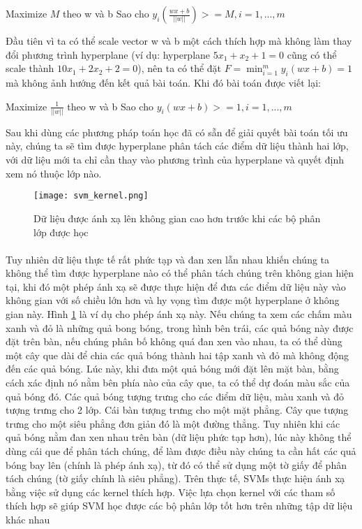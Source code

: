 \begin{center}
Maximize $M$ theo w và b
\linebreak
Sao cho $y_i(\frac{wx + b}{||w||}) >= M, i = 1, ..., m$
\end{center}

Đầu tiên vì ta có thể scale vector w và b một cách thích hợp mà không làm thay đổi phương trình hyperplane (ví dụ: hyperplane $5x_1 + x_2 + 1 = 0$ cũng có thể scale thành $10x_1 + 2x_2 + 2 = 0$), nên ta có thể đặt $F = \min_{i=1}^m {y_i(wx + b)} = 1 $ mà không ảnh hướng đến kết quả bài toán. Khi đó bài toán được viết lại:

\begin{center}
Maximize $\frac{1}{||w||}$ theo w và b
\linebreak
Sao cho $y_i({wx + b}) >= 1, i = 1, ..., m$
\end{center}

Sau khi dùng các phương pháp toán học đã có sẵn để giải quyết bài toán tối ưu này, chúng ta sẽ tìm được hyperplane phân tách các điểm dữ liệu thành hai lớp, với dữ liệu mới ta chỉ cần thay vào phương trình của hyperplane và quyết định xem nó thuộc lớp nào.

\begin{figure}[h!]
	\centering
	\captionsetup{width=0.8\textwidth}
	\texttt{[image: svm\_kernel.png]}
	\caption{Dữ liệu được ánh xạ lên không gian cao hơn trước khi các bộ phân lớp được học}
    \label{fig:svm_kernel}
\end{figure}

\paragraph*{}
Tuy nhiên dữ liệu thực tế rất phức tạp và đan xen lẫn nhau khiến chúng ta không thể tìm được hyperplane nào có thể phân tách chúng trên không gian hiện tại, khi đó một phép ánh xạ sẽ được thực hiện để đưa các điểm dữ liệu này vào không gian với số chiều lớn hơn và hy vọng tìm được một hyperplane ở không gian này. Hình \ref{fig:svm_kernel} là ví dụ cho phép ánh xạ này. Nếu chúng ta xem các chấm màu xanh và đỏ là những quả bong bóng, trong hình bên trái, các quả bóng này được đặt trên bàn, nếu chúng phân bố không quá đan xen vào nhau, ta có thể dùng một cây que dài để chia các quả bóng thành hai tập xanh và đỏ mà không động đến các quả bóng. Lúc này, khi đưa một quả bóng mới đặt lên mặt bàn, bằng cách xác định nó nằm bên phía nào của cây que, ta có thể dự đoán màu sắc của quả bóng đó. Các quả bóng tượng trưng cho các điểm dữ liệu, màu xanh và đỏ tượng trưng cho 2 lớp. Cái bàn tượng trưng cho một mặt phẳng. Cây que tượng trưng cho một siêu phẳng đơn giản đó là một đường thẳng. Tuy nhiên khi các quả bóng nằm đan xen nhau trên bàn (dữ liệu phức tạp hơn), lúc này không thể dùng cái que để phân tách chúng, để làm được điều này chúng ta cần hất các quả bóng bay lên (chính là phép ánh xạ), từ đó có thể sử dụng một tờ giấy để phân tách chúng (tờ giấy chính là siêu phẳng). Trên thực tế, SVMs thực hiện ánh xạ bằng việc sử dụng các kernel thích hợp. Việc lựa chọn kernel với các tham số thích hợp sẽ giúp SVM học được các bộ phân lớp tốt hơn trên những tập dữ liệu khác nhau

